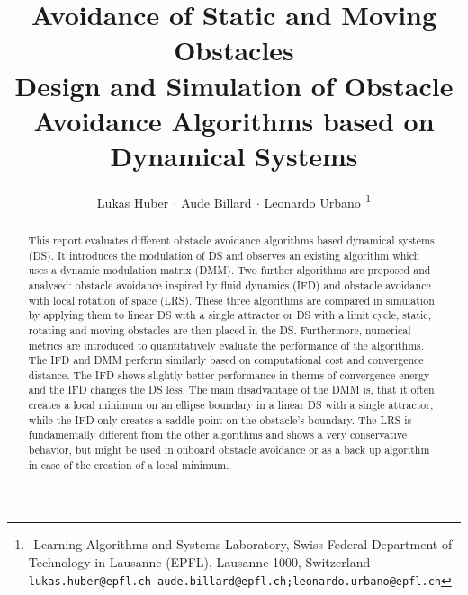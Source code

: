 \documentclass[a4paper, 10pt, conference]{docstyle/ieeeconf}      %
\title{\LARGE{ \bf{Avoidance of Static and Moving Obstacles}} \\
Design and Simulation of Obstacle Avoidance Algorithms based on Dynamical Systems
}
\author{Lukas Huber$^{}$ $\cdot$ Aude Billard$^{}$ $\cdot$ Leonardo Urbano$^{}$  %
  \thanks{$^{}$ Learning Algorithms and Systems Laboratory, Swiss Federal Department of Technology in Lausanne (EPFL), Lausanne 1000, Switzerland
 \tt \small {lukas.huber@epfl.ch}
 \tt\small{aude.billard@epfl.ch;leonardo.urbano@epfl.ch}}
}
\begin{document}
\maketitle

\begin{abstract}
This report evaluates different obstacle avoidance algorithms based dynamical systems (DS). It introduces the modulation of DS and observes an existing algorithm which uses a dynamic modulation matrix (DMM). Two further algorithms are proposed and analysed:  obstacle avoidance inspired by fluid dynamics (IFD) and obstacle avoidance with local rotation of space (LRS). These three algorithms are compared in simulation by applying them to linear DS with a single attractor or DS with a limit cycle, static, rotating and moving obstacles are then placed in the DS. Furthermore, numerical metrics are introduced to quantitatively evaluate the performance of the algorithms. \\
The IFD and DMM perform similarly based on computational cost and convergence distance. The IFD shows slightly better performance in therms of convergence energy and the IFD changes the DS less. The main disadvantage of the DMM is, that it often creates a local minimum on an ellipse boundary in a linear DS with a single attractor, while the IFD only creates a saddle point on the obstacle's boundary. The LRS is fundamentally different from the other algorithms and shows a very conservative behavior, but might be used in onboard obstacle avoidance or as a back up algorithm in case of the creation of a local minimum.
\end{abstract}








\end{document}
